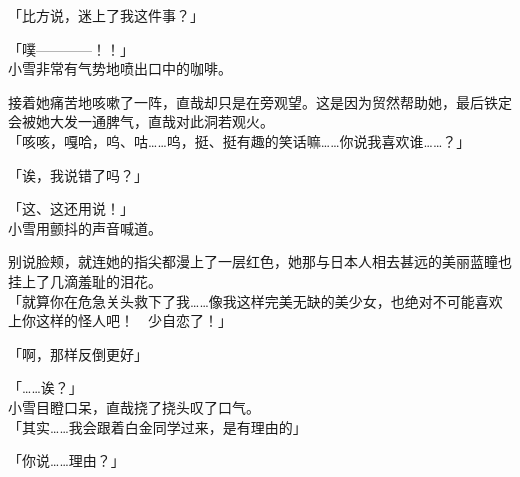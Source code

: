 「比方说，迷上了我这件事？」

 「噗————！！」\\

小雪非常有气势地喷出口中的咖啡。

接着她痛苦地咳嗽了一阵，直哉却只是在旁观望。这是因为贸然帮助她，最后铁定会被她大发一通脾气，直哉对此洞若观火。\\

「咳咳，嘎哈，呜、咕……呜，挺、挺有趣的笑话嘛……你说我喜欢谁……？」

「诶，我说错了吗？」

「这、这还用说！」\\

小雪用颤抖的声音喊道。

别说脸颊，就连她的指尖都漫上了一层红色，她那与日本人相去甚远的美丽蓝瞳也挂上了几滴羞耻的泪花。\\

「就算你在危急关头救下了我……像我这样完美无缺的美少女，也绝对不可能喜欢上你这样的怪人吧！　少自恋了！」

「啊，那样反倒更好」

「……诶？」\\

小雪目瞪口呆，直哉挠了挠头叹了口气。\\

「其实……我会跟着白金同学过来，是有理由的」

「你说……理由？」


